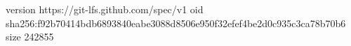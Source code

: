 version https://git-lfs.github.com/spec/v1
oid sha256:f92b70414bdb6893840eabe3088d8506e950f32efef4be2d0c935c3ca78b70b6
size 242855
